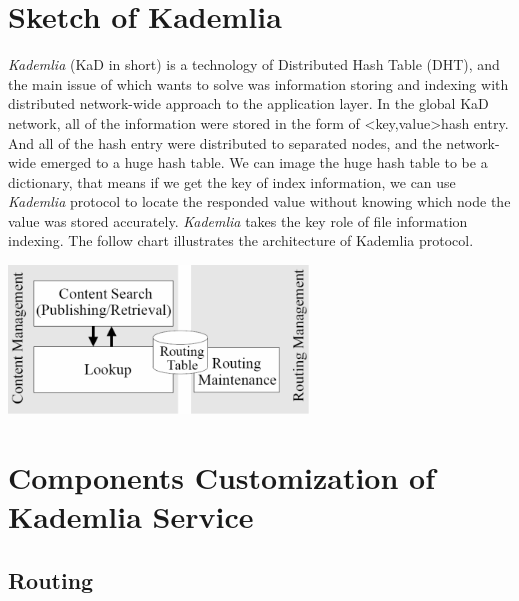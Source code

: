 \section{Sketch of Kademlia}
{
\emph{Kademlia} (KaD in short) is a technology of Distributed Hash Table (DHT), and the main issue of which wants to solve was information storing and indexing with distributed network-wide approach to the application layer.
In the global KaD network, all of the information were stored in the form of \textless key,value\textgreater  hash entry.
And all of the hash entry were distributed to separated nodes, and the network-wide emerged to a huge hash table. 
We can image the huge hash table to be a dictionary, that means if we get the key of index information, we can use \emph{Kademlia} protocol to locate the responded value without knowing which node the value was stored accurately.
\emph{Kademlia} takes the key role of file information indexing.
The follow chart illustrates the architecture of Kademlia protocol.
\begin{center}
\includegraphics[width=8cm]{data/kadarchitecture.png}
\end{center}
}

\section{Components Customization of Kademlia Service}
\subsection{Routing}
